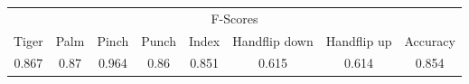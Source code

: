 \documentclass{standalone}
\begin{document}
 
 \begin{tabular}{|c|c|c|c|c|c|c ||c|}
\cline{1-8}\multicolumn{8}{|c|}{F-Scores} \\ 
\cline{1-8}Tiger & Palm & Pinch & Punch & Index & Handflip down & Handflip up & Accuracy\\ 
\cline{1-8}0.867 & 0.87 & 0.964 & 0.86 & 0.851 & 0.615 & 0.614 & 0.854\\ 
 \cline{1-8}\hline \end{tabular}
 
\end{document}
